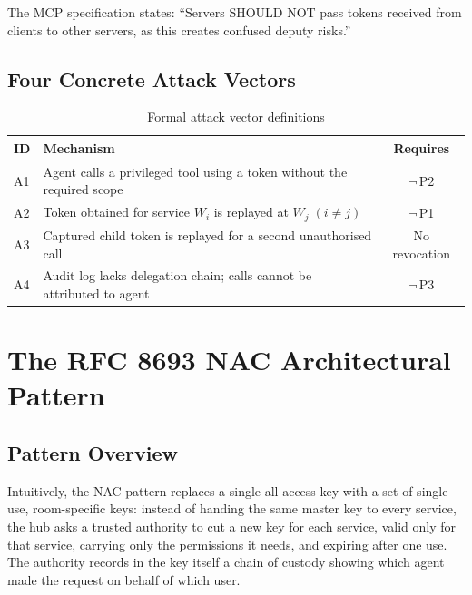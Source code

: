 \documentclass[journal]{IEEEtran}
\begin{document}
The MCP specification \cite{mcp_security} states: ``Servers SHOULD NOT pass
tokens received from clients to other servers, as this creates confused deputy
risks.''

\subsection{Four Concrete Attack Vectors}

\begin{table}[h]
\caption{Formal attack vector definitions}
\label{tab:attack_formal}
\centering
\footnotesize
\setlength{\tabcolsep}{3pt}
\begin{tabularx}{\columnwidth}{l X c}
\toprule
\textbf{ID} & \textbf{Mechanism} & \textbf{Requires} \\
\midrule
A1 & Agent calls a privileged tool using a token without the required scope
     & $\neg$\,P2 \\
A2 & Token obtained for service $W_i$ is replayed at $W_j\;(i\neq j)$
     & $\neg$\,P1 \\
A3 & Captured child token is replayed for a second unauthorised call
     & No revocation \\
A4 & Audit log lacks delegation chain; calls cannot be attributed to agent
     & $\neg$\,P3 \\
\bottomrule
\end{tabularx}
\end{table}


\section{The RFC 8693 NAC Architectural Pattern}
\label{sec:solution}

\subsection{Pattern Overview}

Intuitively, the NAC pattern replaces a single all-access key with a set of
single-use, room-specific keys: instead of handing the same master key to every
service, the hub asks a trusted authority to cut a new key for each service,
valid only for that service, carrying only the permissions it needs, and expiring
after one use. The authority records in the key itself a chain of custody showing
which agent made the request on behalf of which user.
\end{document}
